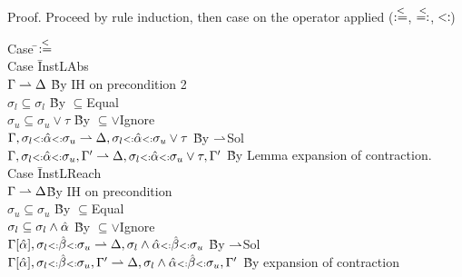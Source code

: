 \documentclass{report}
\begin{document}
Proof. Proceed by rule induction, then case on the operator applied ($\overset{<}{:=}$, $\overset{<}{=:}$, $\st$)
\begin{tabbing}
Case \=$\overset{<}{:=}$\\
\>Case \=InstLAbs\\
\>\>$\Gamma \rightharpoonup \Delta$ \` By IH on precondition 2\\
\>\>$\sigma_l \subseteq \sigma_l$ \` By $\subseteq$Equal\\
\>\>$\sigma_u \subseteq \sigma_u \vee \tau$ \` By $\subseteq\vee$Ignore\\
\>\>$\Gamma,\sigma_l {\scriptstyle{<:}} \hat{\alpha} {\scriptstyle{<:}} \sigma_u \rightharpoonup \Delta,\sigma_l {\scriptstyle{<:}} \hat{\alpha} {\scriptstyle{<:}} \sigma_u \vee \tau$ \` By $\rightharpoonup$Sol\\
\>\>$\Gamma,\sigma_l {\scriptstyle{<:}} \hat{\alpha} {\scriptstyle{<:}} \sigma_u,\Gamma' \rightharpoonup \Delta,\sigma_l {\scriptstyle{<:}} \hat{\alpha} {\scriptstyle{<:}} \sigma_u \vee \tau,\Gamma'$ \` By Lemma expansion of contraction.\\
\>Case \=InstLReach\\
\>\>$\Gamma \rightharpoonup \Delta$\` By IH on precondition\\
\>\>$\sigma_u \subseteq \sigma_u$ \` By $\subseteq$Equal\\
\>\>$\sigma_l \subseteq \sigma_{l} \wedge \hat{\alpha}$ \` By $\subseteq\vee$Ignore\\
\>\>$\Gamma[\hat{\alpha}],\sigma_{l} {\scriptstyle{<:}} \hat{\beta} {\scriptstyle{<:}} \sigma_{u}\rightharpoonup \Delta,\sigma_{l} \wedge \hat{\alpha} {\scriptstyle{<:}} \hat{\beta} {\scriptstyle{<:}} \sigma_{u}$ \` By $\rightharpoonup$Sol\\
\>\>$\Gamma[\hat{\alpha}],\sigma_{l} {\scriptstyle{<:}} \hat{\beta} {\scriptstyle{<:}} \sigma_{u},\Gamma'\rightharpoonup \Delta,\sigma_{l} \wedge \hat{\alpha} {\scriptstyle{<:}} \hat{\beta} {\scriptstyle{<:}} \sigma_{u},\Gamma'$ \` By expansion of contraction\\
\end{tabbing}
\end{document}
